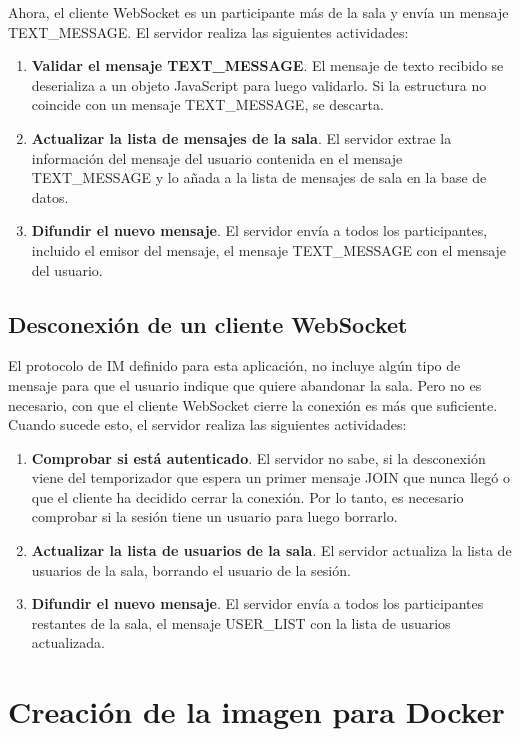 Ahora, el cliente WebSocket es un participante más de la sala y envía un mensaje TEXT\_MESSAGE. El servidor realiza las siguientes actividades:

\begin{enumerate}
  \item \textbf{Validar el mensaje TEXT\_MESSAGE}. El mensaje de texto recibido se deserializa a un objeto JavaScript para luego validarlo. Si la estructura no coincide con un mensaje TEXT\_MESSAGE, se descarta.
  \item \textbf{Actualizar la lista de mensajes de la sala}. El servidor extrae la información del mensaje del usuario contenida en el mensaje TEXT\_MESSAGE y lo añada a la lista de mensajes de sala en la base de datos.
  \item \textbf{Difundir el nuevo mensaje}. El servidor envía a todos los participantes, incluido el emisor del mensaje, el mensaje TEXT\_MESSAGE con el mensaje del usuario.
\end{enumerate}

\subsection{Desconexión de un cliente WebSocket}

El protocolo de IM definido para esta aplicación, no incluye algún tipo de mensaje para que el usuario indique que quiere abandonar la sala. Pero no es necesario, con que el cliente WebSocket cierre la conexión es más que suficiente. Cuando sucede esto, el servidor realiza las siguientes actividades:

\begin{enumerate}
  \item \textbf{Comprobar si está autenticado}. El servidor no sabe, si la desconexión viene del temporizador que espera un primer mensaje JOIN que nunca llegó o que el cliente ha decidido cerrar la conexión. Por lo tanto, es necesario comprobar si la sesión tiene un usuario para luego borrarlo.
  \item \textbf{Actualizar la lista de usuarios de la sala}. El servidor actualiza la lista de usuarios de la sala, borrando el usuario de la sesión.
  \item \textbf{Difundir el nuevo mensaje}. El servidor envía a todos los participantes restantes de la sala, el mensaje USER\_LIST con la lista de usuarios actualizada.
\end{enumerate}

\section{Creación de la imagen para Docker}


